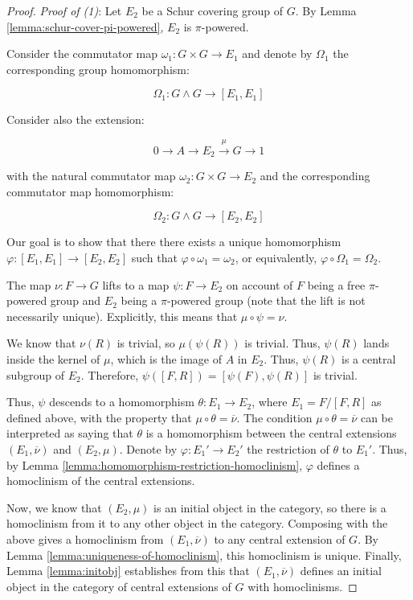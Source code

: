 \begin{proof}
  {\em Proof of (1)}: Let $E_2$ be a Schur covering group of $G$. By
  Lemma \ref{lemma:schur-cover-pi-powered}, $E_2$ is $\pi$-powered.

  Consider the commutator map $\omega_1:G \times G \to E_1$ and denote
  by $\Omega_1$ the corresponding group homomorphism:

  $$\Omega_1: G \wedge G \to [E_1,E_1]$$

  Consider also the extension:

  $$0 \to A \to E_2 \stackrel{\mu}{\to} G \to 1$$
  
  with the natural commutator map $\omega_2:G \times G \to E_2$ and the
  corresponding commutator map homomorphism:

  $$\Omega_2:G \wedge G \to [E_2,E_2]$$
  
  Our goal is to show that there there exists a unique homomorphism
  $\varphi:[E_1,E_1] \to [E_2,E_2]$ such that $\varphi \circ
  \omega_1 = \omega_2$, or equivalently, $\varphi \circ \Omega_1 =
  \Omega_2$.

  The map $\nu:F \to G$ lifts to a map $\psi:F \to E_2$ on account of
  $F$ being a free $\pi$-powered group and $E_2$ being a $\pi$-powered
  group (note that the lift is not necessarily unique). Explicitly,
  this means that $\mu \circ \psi = \nu$.

  We know that $\nu(R)$ is trivial, so $\mu(\psi(R))$ is trivial. Thus,
  $\psi(R)$ lands inside the kernel of $\mu$, which is the image of $A$
  in $E_2$. Thus, $\psi(R)$ is a central subgroup of $E_2$. Therefore,
  $\psi([F,R]) = [\psi(F),\psi(R)]$ is trivial.
  
  Thus, $\psi$ descends to a homomorphism $\theta:E_1 \to E_2$, where
  $E_1 = F/[F,R]$ as defined above, with the property that $\mu \circ
  \theta = \overline{\nu}$. The condition $\mu \circ \theta =
  \overline{\nu}$ can be interpreted as saying that $\theta$ is a
  homomorphism between the central extensions $(E_1,\overline{\nu})$ and
  $(E_2,\mu)$. Denote by $\varphi:E_1' \to E_2'$ the restriction of
  $\theta$ to $E_1'$. Thus, by Lemma
  \ref{lemma:homomorphism-restriction-homoclinism}, $\varphi$ defines a
  homoclinism of the central extensions. 

  Now, we know that $(E_2,\mu)$ is an initial object in the category,
  so there is a homoclinism from it to any other object in the
  category. Composing with the above gives a homoclinism from
  $(E_1,\overline{\nu})$ to any central extension of $G$. By Lemma
  \ref{lemma:uniqueness-of-homoclinism}, this homoclinism is
  unique. Finally, Lemma \ref{lemma:initobj} establishes from this that
  $(E_1,\overline{\nu})$ defines an initial object in the category of central
  extensions of $G$ with homoclinisms.


\end{proof}
